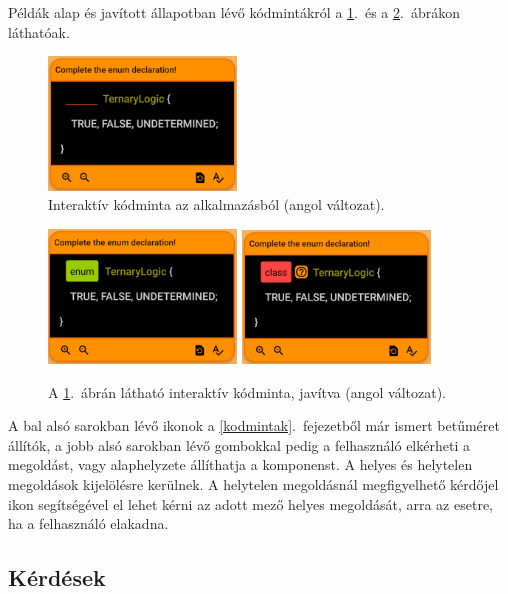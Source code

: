 \documentclass[12pt,a4paper]{article}
\begin{document}
	Példák alap és javított állapotban lévő kódmintákról a \ref{interactive_component_figure}.\ és a \ref{interactive_component_completed_figure}.\ ábrákon láthatóak. 
	
	\begin{figure}
		\centering
		\includegraphics[width=5cm]{interactive_not_completed}
		\caption{Interaktív kódminta az alkalmazásból (angol változat).}
		\label{interactive_component_figure}
	\end{figure}
	
	\begin{figure}
		\centering
		\includegraphics[width=5cm]{interactive_correct}
		\includegraphics[width=5cm]{interactive_incorrect}
		\caption{A \ref{interactive_component_figure}.\ ábrán látható interaktív kódminta, javítva (angol változat).}
		\label{interactive_component_completed_figure}
	\end{figure}
	
	A bal alsó sarokban lévő ikonok a \ref{kodmintak}.\ fejezetből már ismert betűméret állítók, a jobb alsó sarokban lévő gombokkal pedig a felhasználó elkérheti a megoldást, vagy alaphelyzete állíthatja a komponenst. A helyes és helytelen megoldások kijelölésre kerülnek. A helytelen megoldásnál megfigyelhető kérdőjel ikon segítségével el lehet kérni az adott mező helyes megoldását, arra az esetre, ha a felhasználó elakadna.
	
	\subsection{Kérdések}\label{kerdesek}
	
\end{document}
